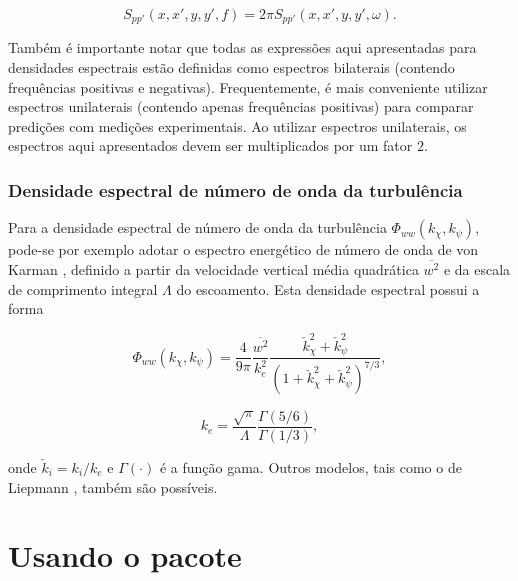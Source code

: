 \documentclass[a4paper, 11pt, twoside]{article}
\begin{document}
\begin{equation}
	S_{p p'} (x, x', y, y', f) = 2 \pi S_{p p'} (x, x', y, y', \omega).
\end{equation}

Também é importante notar que todas as expressões aqui apresentadas para densidades espectrais estão definidas como espectros bilaterais (contendo frequências positivas e negativas). Frequentemente, é mais conveniente utilizar espectros unilaterais (contendo apenas frequências positivas) para comparar predições com medições experimentais. Ao utilizar espectros unilaterais, os espectros aqui apresentados devem ser multiplicados por um fator $2$.

\subsubsection{Densidade espectral de número de onda da turbulência}

Para a densidade espectral de número de onda da turbulência $\Phi_{ww}(k_\chi, k_\psi)$, pode-se por exemplo adotar o espectro energético de número de onda de von Karman \cite{Amiet75}, definido a partir da velocidade vertical média quadrática $\overline{w^2}$ e da escala de comprimento integral $\Lambda$ do escoamento. Esta densidade espectral possui a forma

\begin{equation}
	\Phi_{ww}(k_\chi, k_\psi) = \frac{4}{9 \pi} \frac{\overline{w^2}}{k_e^2} \frac{\check{k}_\chi^2 + \check{k}_\psi^2}{\left(1 + \check{k}_\chi^2 + \check{k}_\psi^2 \right)^{7/3}},
	\label{eq:vonKarmanModel}
\end{equation}

\begin{equation}
	k_e = \frac{\sqrt{\pi}}{\Lambda} \frac{\Gamma (5/6)}{\Gamma (1/3)},
\end{equation}

\noindent onde $\check{k}_i = k_i/k_e$ e $\Gamma (\cdot)$ é a função gama. Outros modelos, tais como o de Liepmann \cite{Paruchuri2017}, também são possíveis.




\clearpage
\newpage
\section{Usando o pacote}
\label{Sec:UsingThePackage}
\end{document}
